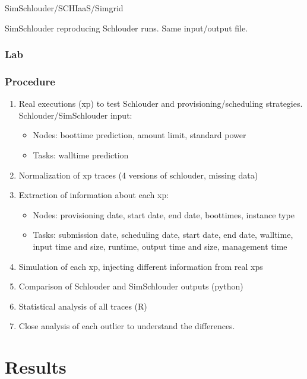 \documentclass[a4paper,10pt]{article}
\begin{document}
SimSchlouder/SCHIaaS/Simgrid

SimSchlouder reproducing Schlouder runs. Same input/output file.

\subsubsection{Lab}

\subsubsection{Procedure}

\begin{enumerate}
 \item Real executions (xp) to test Schlouder and provisioning/scheduling 
strategies.
  Schlouder/SimSchlouder input:
  \begin{itemize}
   \item Nodes: boottime prediction, amount limit, standard power
   \item Tasks: walltime prediction
  \end{itemize}
 
 \item Normalization of xp traces (4 versions of schlouder, missing data)
 \item Extraction of information about each xp:
  \begin{itemize}
   \item Nodes: provisioning date, start date, end date, boottimes, instance 
type
   \item Tasks: submission date, scheduling date, start date, end date, 
	  walltime, input time and size, runtime, output time and size, 
management time
  \end{itemize}
 \item Simulation of each xp, injecting different information from real xps
 \item Comparison of Schlouder and SimSchlouder outputs (python)
 \item Statistical analysis of all traces (R)
 \item Close analysis of each outlier to understand the differences. 
\end{enumerate}






\section{Results}
\end{document}
